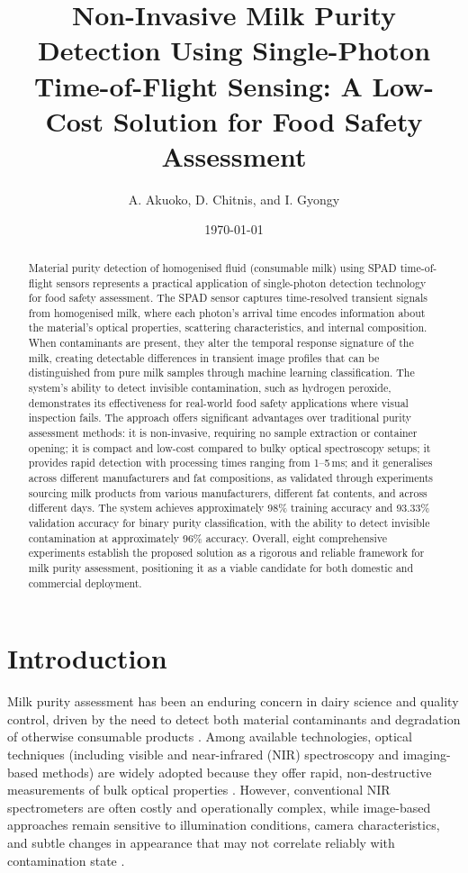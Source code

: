 \documentclass[11pt]{article}
\title{Non-Invasive Milk Purity Detection Using Single-Photon Time-of-Flight Sensing: A Low-Cost Solution for Food Safety Assessment}
\author{A. Akuoko, D. Chitnis, and I. Gyongy}
\date{\today}
\begin{document}
\maketitle

\begin{abstract}
Material purity detection of homogenised fluid (consumable milk) using SPAD time-of-flight sensors represents a practical application of single-photon detection technology for food safety assessment. The SPAD sensor captures time-resolved transient signals from homogenised milk, where each photon's arrival time encodes information about the material's optical properties, scattering characteristics, and internal composition. When contaminants are present, they alter the temporal response signature of the milk, creating detectable differences in transient image profiles that can be distinguished from pure milk samples through machine learning classification. The system's ability to detect invisible contamination, such as hydrogen peroxide, demonstrates its effectiveness for real-world food safety applications where visual inspection fails. The approach offers significant advantages over traditional purity assessment methods: it is non-invasive, requiring no sample extraction or container opening; it is compact and low-cost compared to bulky optical spectroscopy setups; it provides rapid detection with processing times ranging from 1--5\,ms; and it generalises across different manufacturers and fat compositions, as validated through experiments sourcing milk products from various manufacturers, different fat contents, and across different days. The system achieves approximately 98\% training accuracy and 93.33\% validation accuracy for binary purity classification, with the ability to detect invisible contamination at approximately 96\% accuracy. Overall, eight comprehensive experiments establish the proposed solution as a rigorous and reliable framework for milk purity assessment, positioning it as a viable candidate for both domestic and commercial deployment.
\end{abstract}

\section{Introduction}

Milk purity assessment has been an enduring concern in dairy science and quality control, driven by the need to detect both material contaminants and degradation of otherwise consumable products \cite{walstra1999,goodman1986}. Among available technologies, optical techniques (including visible and near-infrared (NIR) spectroscopy and imaging-based methods) are widely adopted because they offer rapid, non-destructive measurements of bulk optical properties \cite{aernouts2015,melfsen2012,joolaei2025}. However, conventional NIR spectrometers are often costly and operationally complex, while image-based approaches remain sensitive to illumination conditions, camera characteristics, and subtle changes in appearance that may not correlate reliably with contamination state \cite{sun2009,chandra2024}.
\end{document}
